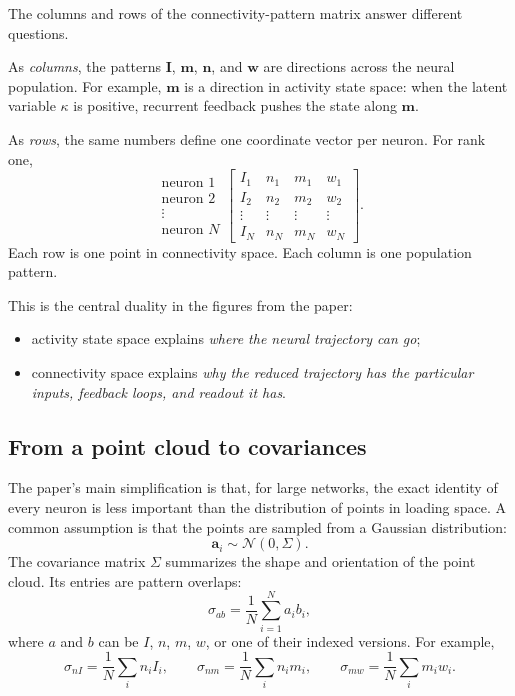 \documentclass[11pt]{article}
\newcommand{\vm}{\mathbf{m}}
\newcommand{\vn}{\mathbf{n}}
\newcommand{\vI}{\mathbf{I}}
\newcommand{\vw}{\mathbf{w}}
\begin{document}
The columns and rows of the connectivity-pattern matrix answer different
questions.

As \emph{columns}, the patterns $\vI$, $\vm$, $\vn$, and $\vw$ are directions
across the neural population. For example, $\vm$ is a direction in activity
state space: when the latent variable $\kappa$ is positive, recurrent feedback
pushes the state along $\vm$.

As \emph{rows}, the same numbers define one coordinate vector per neuron. For
rank one,
\[
  \begin{array}{c}
  \text{neuron }1\\
  \text{neuron }2\\
  \vdots\\
  \text{neuron }N
  \end{array}
  \left[
  \begin{array}{cccc}
  I_1 & n_1 & m_1 & w_1\\
  I_2 & n_2 & m_2 & w_2\\
  \vdots & \vdots & \vdots & \vdots\\
  I_N & n_N & m_N & w_N
  \end{array}
  \right].
\]
Each row is one point in connectivity space. Each column is one population
pattern.

This is the central duality in the figures from the paper:
\begin{itemize}
  \item activity state space explains \emph{where the neural trajectory can go};
  \item connectivity space explains \emph{why the reduced trajectory has the
  particular inputs, feedback loops, and readout it has}.
\end{itemize}

\subsection{From a point cloud to covariances}

The paper's main simplification is that, for large networks, the exact identity
of every neuron is less important than the distribution of points in loading
space. A common assumption is that the points are sampled from a Gaussian
distribution:
\begin{equation}
  \mathbf{a}_i \sim \mathcal{N}(0,\Sigma).
  \label{eq:single_loading_gaussian}
\end{equation}
The covariance matrix $\Sigma$ summarizes the shape and orientation of the point
cloud. Its entries are pattern overlaps:
\begin{equation}
  \sigma_{ab}
  =
  \frac{1}{N}\sum_{i=1}^{N} a_i b_i,
  \label{eq:pattern_covariance}
\end{equation}
where $a$ and $b$ can be $I$, $n$, $m$, $w$, or one of their indexed versions.
For example,
\[
  \sigma_{nI} = \frac{1}{N}\sum_i n_i I_i,
  \qquad
  \sigma_{nm} = \frac{1}{N}\sum_i n_i m_i,
  \qquad
  \sigma_{mw} = \frac{1}{N}\sum_i m_i w_i.
\]
\end{document}
